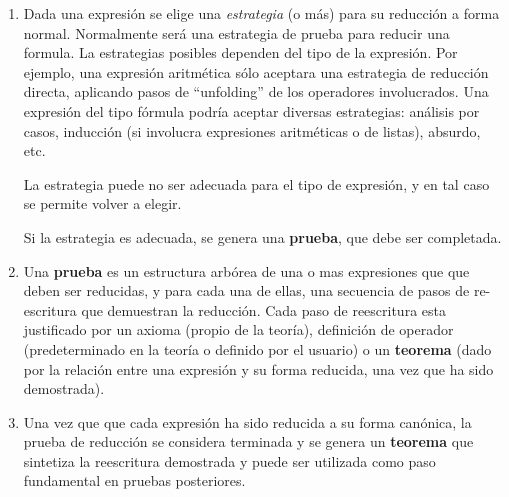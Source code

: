 \documentclass{article}
\begin{document}
\begin{enumerate}
\item Dada una expresión se elige una \emph{estrategia} (o más) para su reducción
  a forma normal. Normalmente será una estrategia de prueba para reducir una
  formula. La estrategias posibles dependen del tipo de la expresión. Por 
  ejemplo, una expresión aritmética sólo aceptara una estrategia de
  reducción directa, aplicando pasos de ``unfolding'' de los operadores
  involucrados. Una expresión del tipo fórmula podría aceptar diversas 
  estrategias: análisis por casos, inducción (si involucra expresiones 
  aritméticas o de listas), absurdo, etc.
  
  La estrategia puede no ser adecuada para el tipo de expresión, y en tal caso
  se permite volver a elegir.
  
  Si la estrategia es adecuada, se genera una \textbf{prueba}, que debe ser 
  completada.
  
\item Una \textbf{prueba} es un estructura arbórea de una o mas expresiones que
  que deben ser reducidas, y para cada una de ellas, una secuencia de pasos de 
  re-escritura que demuestran la reducción. Cada paso de reescritura esta
  justificado por un axioma (propio de la teoría), definición de operador
  (predeterminado en la teoría o definido por el usuario) o un \textbf{teorema}
  (dado por la relación entre una expresión y su forma reducida, una vez
  que ha sido demostrada).
  
\item Una vez que que cada expresión ha sido reducida a su forma canónica, 
  la prueba de reducción se considera terminada y se genera un \textbf{teorema}
  que sintetiza la reescritura demostrada y puede ser utilizada como paso
  fundamental en pruebas posteriores.
\end{enumerate}
\end{document}
